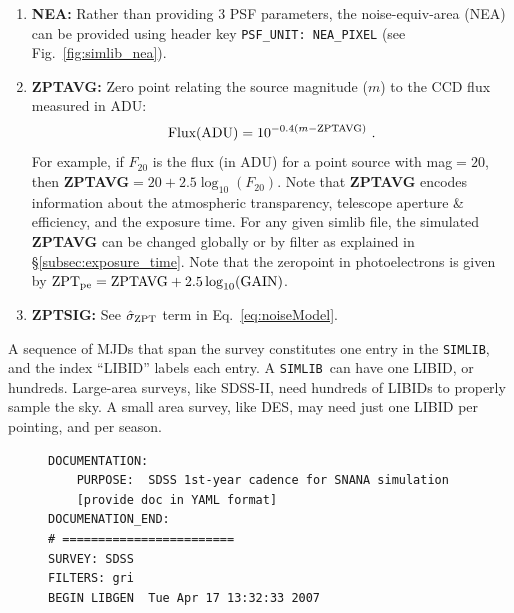 \documentclass[12pt]{article}
\newcommand{\simlib}{{\tt SIMLIB}}
\newcommand{\sigZPT}{\hat\sigma_{\rm ZPT}}
\newcommand{\ZPTpe}{{\rm ZPT}_{\rm pe}}
\begin{document}
{\begin{enumerate}
	 {\bf RATIO} refers to the ratio at the origin,
	 PSF2(origin)/PSF1(origin). Note that the default PSF unit
	 is in pixels, not arcsec. You can optionally give the PSF 
	 values in the more astronomy-friendly units of arcsec-FWHM 
	 by specifying the simlib header key
        \vspace{-0.4cm}
	\begin{verbatim} 
           PSF_UNIT:  ARCSEC_FWHM
	\end{verbatim} 
        \vspace{-0.4cm}
	The simulated README file includes the {\tt PSF\_UNIT} value.
	These PSF values are used to determine a noise-equivalent
	area ($A$ in Eq.~\ref{eq:noiseModel} and Eq.~\ref{eq:NEA_formula}). 
	If you have computed $A$ from the measured PSF, 
	then you can simply define 
	${\rm PSF1} = \sqrt{A/4\pi}$ and set {\bf PSF2}={\bf RATIO}=0.
%
  \item {\bf NEA:} Rather than providing 3 PSF parameters, the noise-equiv-area
       (NEA) can be provided using header key {\tt PSF\_UNIT: NEA\_PIXEL}
       (see Fig.~\ref{fig:simlib_nea}).
%
  \item {\bf ZPTAVG:} Zero point relating the source magnitude ($m$) 
    to the CCD flux measured in ADU: 
       $$ {\rm Flux(ADU)} = 10^{-0.4(m-{\rm ZPTAVG})}~.  $$
    For example, if $F_{20}$ is the flux (in ADU) for a point source
    with mag$=20$, then {\bf ZPTAVG}$= 20 + 2.5\log_{10}(F_{20})$.
    Note that {\bf ZPTAVG} encodes information about the 
    atmospheric transparency, telescope aperture \& efficiency,
    and the exposure time. 
    For any given simlib file, the simulated {\bf ZPTAVG} can be changed
    globally or by filter as explained in \S\ref{subsec:exposure_time}.
    Note that the zeropoint in photoelectrons is given by
    $\ZPTpe = {\rm ZPTAVG} + 2.5\log_{10}({\rm GAIN})$.
%
  \item {\bf ZPTSIG:} See $\sigZPT$ term in Eq.~\ref{eq:noiseModel}.
\end{enumerate}


A sequence of MJDs that span the survey constitutes one entry
in the {\simlib}, and the index ``LIBID'' labels each entry.
A \simlib\ can have one LIBID, or hundreds. Large-area surveys,
like SDSS-II, need hundreds of LIBIDs to properly sample the sky.
A small area survey, like DES, may need just one LIBID per pointing,
and per season.


\begin{figure} [ht] 
\begin{center}
\begin{Verbatim}[frame=single]
DOCUMENTATION:
    PURPOSE:  SDSS 1st-year cadence for SNANA simulation
    [provide doc in YAML format]
DOCUMENATION_END:
# ========================
SURVEY: SDSS     
FILTERS: gri 
BEGIN LIBGEN  Tue Apr 17 13:32:33 2007
 

\end{Verbatim}
\end{center}
\end{figure}}
\end{document}
